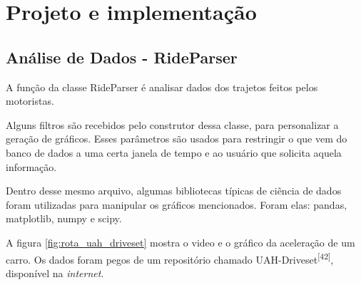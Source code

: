 


\section{Projeto e implementação}

   

    \subsection{Análise de Dados - RideParser}\label{rideparser}

    A função da classe RideParser é analisar dados dos trajetos feitos pelos motoristas. 
    
    Alguns filtros são recebidos pelo construtor dessa classe, para personalizar a geração de gráficos. Esses parâmetros são usados para restringir o que vem do banco de dados a uma certa janela de tempo e ao usuário que solicita aquela informação.
    
    Dentro desse mesmo arquivo, algumas bibliotecas típicas de ciência de dados foram utilizadas para manipular os gráficos mencionados. Foram elas: pandas, matplotlib, numpy e scipy.
    
    A figura \ref{fig:rota_uah_driveset} mostra o video e o gráfico da aceleração de um carro. Os dados foram pegos de um repositório chamado UAH-Driveset\textsuperscript{[42]}, disponível na \textit{internet}.
    
